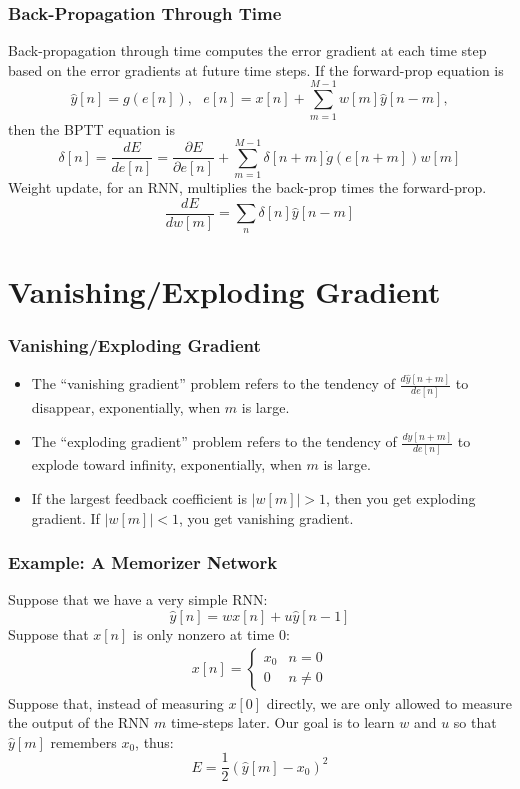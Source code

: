 \documentclass{beamer}
\begin{document}
\begin{frame}
  \frametitle{Back-Propagation Through Time}
  Back-propagation through time computes the error gradient at
  each time step based on the error gradients at future time steps.
  If the forward-prop equation is
  \begin{displaymath}
    \hat{y}[n]=g(e[n]),~~~e[n]=x[n]+\sum_{m=1}^{M-1} w[m]\hat{y}[n-m],
  \end{displaymath}
  then the BPTT equation is
  \begin{displaymath}
    \delta[n]=\frac{dE}{de[n]}=\frac{\partial E}{\partial e[n]}+
    \sum_{m=1}^{M-1}\delta[n+m]\dot{g}(e[n+m])w[m]
  \end{displaymath}
  Weight update, for an RNN, multiplies the back-prop times the
  forward-prop.
  \[
  \frac{dE}{dw[m]} = \sum_n \delta[n] \hat{y}[n-m]
  \]
\end{frame}


\section[Vanishing Gradient]{Vanishing/Exploding Gradient}
\setcounter{subsection}{1}

\begin{frame}
  \frametitle{Vanishing/Exploding Gradient}
  \begin{itemize}
    \item The ``vanishing gradient'' problem refers to the tendency of
      $\frac{d\hat{y}[n+m]}{de[n]}$ to disappear,
      exponentially, when $m$ is large.
  \item
    The ``exploding gradient'' problem refers to the tendency of
    $\frac{d\hat{y}[n+m]}{de[n]}$ to explode toward infinity,
    exponentially, when $m$ is large.
  \item
    If the largest feedback coefficient is $|w[m]|>1$, then you get
    exploding gradient.  If $|w[m]|<1$, you get vanishing gradient.
    \end{itemize}
\end{frame}

\begin{frame}
  \frametitle{Example: A Memorizer Network}
  Suppose that we have a very simple RNN:
  \[
  \hat{y}[n] = w x[n]+u\hat{y}[n-1]
  \]
  Suppose that $x[n]$ is only nonzero at time $0$:
  \begin{align*}
    x[n]=\begin{cases}x_0&n=0\\0& n\ne 0\end{cases}
  \end{align*}
  Suppose that, instead of measuring $x[0]$ directly, we are only
  allowed to measure the output of the RNN $m$ time-steps later.  Our goal is
  to learn $w$ and $u$ so that $\hat{y}[m]$ remembers $x_0$, thus:
  \[
  E=\frac{1}{2}\left(\hat{y}[m]-x_0\right)^2
  \]
\end{frame}
\end{document}
